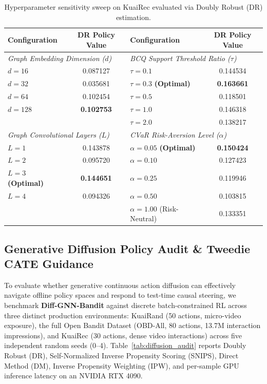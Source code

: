 \documentclass[preprint,12pt,3p]{elsarticle}
\begin{document}
\begin{table}[t]
\centering
\small
\caption{Hyperparameter sensitivity sweep on KuaiRec evaluated via Doubly Robust (DR) estimation.}
\label{tab:sensitivity}
\begin{tabular}{lc|lc}
\toprule
\textbf{Configuration} & \textbf{DR Policy Value} & \textbf{Configuration} & \textbf{DR Policy Value} \\
\midrule
\multicolumn{2}{l|}{\textit{Graph Embedding Dimension ($d$)}} & \multicolumn{2}{l}{\textit{BCQ Support Threshold Ratio ($\tau$)}} \\
$d = 16$  & 0.087127 & $\tau = 0.1$ & 0.144534 \\
$d = 32$  & 0.035681 & $\tau = 0.3$ \textbf{(Optimal)} & \textbf{0.163661} \\
$d = 64$  & 0.102454 & $\tau = 0.5$ & 0.118501 \\
$d = 128$ & \textbf{0.102753} & $\tau = 1.0$ & 0.146318 \\
 & & $\tau = 2.0$ & 0.138217 \\
\midrule
\multicolumn{2}{l|}{\textit{Graph Convolutional Layers ($L$)}} & \multicolumn{2}{l}{\textit{CVaR Risk-Aversion Level ($\alpha$)}} \\
$L = 1$ & 0.143878 & $\alpha = 0.05$ \textbf{(Optimal)} & \textbf{0.150424} \\
$L = 2$ & 0.095720 & $\alpha = 0.10$ & 0.127423 \\
$L = 3$ \textbf{(Optimal)} & \textbf{0.144651} & $\alpha = 0.25$ & 0.119946 \\
$L = 4$ & 0.094326 & $\alpha = 0.50$ & 0.103815 \\
 & & $\alpha = 1.00$ (Risk-Neutral) & 0.133351 \\
\bottomrule
\end{tabular}
\end{table}

\subsection{Generative Diffusion Policy Audit \& Tweedie CATE Guidance}
\label{sec:diffusion_results}
To evaluate whether generative continuous action diffusion can effectively navigate offline policy spaces and respond to test-time causal steering, we benchmark \textbf{Diff-GNN-Bandit} against discrete batch-constrained RL across three distinct production environments: KuaiRand (50 actions, micro-video exposure), the full Open Bandit Dataset (OBD-All, 80 actions, 13.7M interaction impressions), and KuaiRec (30 actions, dense video interactions) across five independent random seeds (0--4). Table~\ref{tab:diffusion_audit} reports Doubly Robust (DR), Self-Normalized Inverse Propensity Scoring (SNIPS), Direct Method (DM), Inverse Propensity Weighting (IPW), and per-sample GPU inference latency on an NVIDIA RTX 4090.
\end{document}
